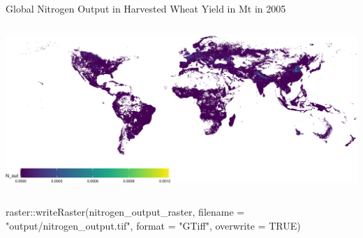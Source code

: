 \documentclass[
  ignorenonframetext,
  aspectratio=169,
]{beamer}
\newenvironment{Shaded}{\begin{snugshade}}{\end{snugshade}}
\newcommand{\AttributeTok}[1]{\textcolor[rgb]{0.40,0.45,0.13}{#1}}
\newcommand{\ConstantTok}[1]{\textcolor[rgb]{0.56,0.35,0.01}{#1}}
\newcommand{\FunctionTok}[1]{\textcolor[rgb]{0.28,0.35,0.67}{#1}}
\newcommand{\NormalTok}[1]{\textcolor[rgb]{0.00,0.23,0.31}{#1}}
\newcommand{\SpecialCharTok}[1]{\textcolor[rgb]{0.37,0.37,0.37}{#1}}
\newcommand{\StringTok}[1]{\textcolor[rgb]{0.13,0.47,0.30}{#1}}
\begin{document}
\begin{frame}[fragile]{Global Nitrogen Output in Harvested Wheat Yield
in Mt in 2005}
\protect\hypertarget{global-nitrogen-output-in-harvested-wheat-yield-in-mt-in-2005}{}
\begin{columns}[T]
\begin{column}{0.95\textwidth}
\linespread{0.5}

\includegraphics{global_n_files/figure-beamer/nitrogen-output-plot-1.pdf}

\linespread{2}
\end{column}
\end{columns}

\linespread{0.5}

\begin{Shaded}
\begin{Highlighting}[]
\NormalTok{raster}\SpecialCharTok{::}\FunctionTok{writeRaster}\NormalTok{(nitrogen\_output\_raster, }\AttributeTok{filename =} \StringTok{"output/nitrogen\_output.tif"}\NormalTok{, }\AttributeTok{format =} \StringTok{"GTiff"}\NormalTok{, }\AttributeTok{overwrite =} \ConstantTok{TRUE}\NormalTok{)}
\end{Highlighting}
\end{Shaded}

\linespread{2}
\end{frame}
\end{document}
